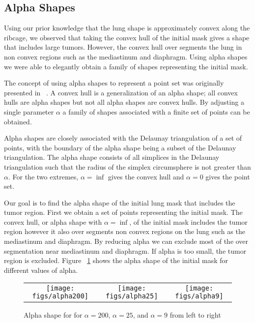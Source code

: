 \documentclass{llncs}
\begin{document}
\subsection{Alpha Shapes}
%
Using our prior knowledge that the lung shape is approximately convex along the ribcage, we observed that taking the convex hull of the initial mask gives a shape that includes large tumors. However, the convex hull over segments the lung in non convex regions such as the mediastinum and diaphragm. Using alpha shapes we were able to elegantly obtain a family of shapes representing the initial mask. 

The concept of using alpha shapes to represent a point set was originally presented in ~\cite{edelsbrunner1983}. A convex hull is a generalization of an alpha shape; all convex hulls are alpha shapes but not all alpha shapes are convex hulls. By adjusting a single parameter $\alpha$ a family of shapes associated with a finite set of points can be obtained.

Alpha shapes are closely associated with the Delaunay triangulation of a set of points, with the boundary of the alpha shape being a subset of the Delaunay triangulation. The alpha shape consists of all simplices in the Delaunay triangulation such that the radius of the simplex circumsphere is not greater than $ \alpha $. For the two extremes, $ \alpha=\inf $ gives the convex hull and  $ \alpha=0 $ gives the point set. 

Our goal is to find the alpha shape of the initial lung mask that includes the tumor region. First we obtain a set of points representing the initial mask. The convex hull, or alpha shape with $ \alpha = \inf $, of the initial mask includes the tumor region however it also over segments non convex regions on the lung such as the mediastinum and diaphragm. By reducing alpha we can exclude most of the over segmentation near mediastinum and diaphragm. If alpha is too small, the tumor region is excluded. Figure ~\ref{fig:alphashapes} shows the alpha shape of the initial mask for different values of alpha. 

\begin{figure}[t]
  \centering
  \begin{tabular}{ccc}
    \texttt{[image: figs/alpha200]} & 
    \texttt{[image: figs/alpha25]} & \texttt{[image: figs/alpha9]} \\
  \end{tabular}
  \caption{Alpha shape for for $\alpha=200$, $\alpha=25$, and $\alpha=9$ from left to right}
  \label{fig:alphashapes}
\end{figure}
%
\end{document}
